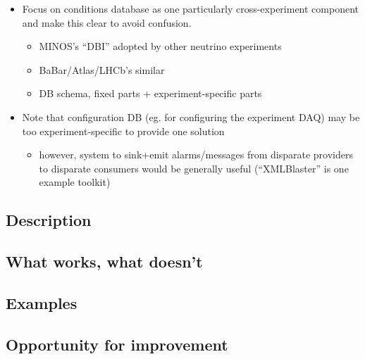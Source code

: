 \begin{itemize}
\item Focus on conditions database as one particularly cross-experiment component and make this clear to avoid confusion.
  \begin{itemize}
  \item MINOS's ``DBI'' adopted by other neutrino experiments
  \item BaBar/Atlas/LHCb's similar
  \item DB schema, fixed parts + experiment-specific parts
  \end{itemize}
\item Note that configuration DB (eg. for configuring the experiment DAQ) may be too experiment-specific to provide one solution
  \begin{itemize}
  \item however, system to sink+emit alarms/messages from disparate providers to disparate consumers would be generally useful (``XMLBlaster'' is one example toolkit)
  \end{itemize}
\end{itemize}

\subsection{Description}
\subsection{What works, what doesn't}
\subsection{Examples}
\subsection{Opportunity for improvement}
